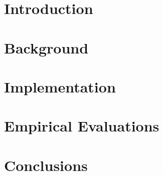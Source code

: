 \documentclass{Configuration_Files/PoliMi3i_thesis}
\theoremstyle{definition}
\theoremstyle{remark}
\begin{document}
\mainmatter %

\chapter{Introduction}\label{chap:intro}


\chapter{Background}\label{chap:background}


\chapter{Implementation}\label{chap:implementation}


\chapter{Empirical Evaluations}\label{chap:empirical}


\chapter{Conclusions}\label{chap:conclusions}





\cleardoublepage
{} %
\appendix

\end{document}
